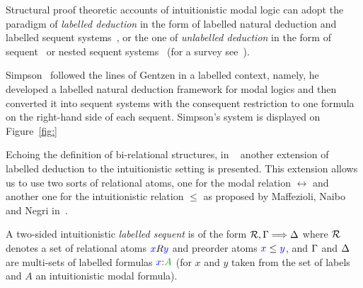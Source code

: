\documentclass[twoside]{aiml18}
\begin{document}

Structural proof theoretic accounts of intuitionistic modal logic can adopt the paradigm of \emph{labelled deduction} in the form of labelled natural deduction and labelled sequent systems~\cite{Simpson}, or the one of \emph{unlabelled deduction} in the form of sequent~\cite{Bierman} or nested sequent systems~\cite{Strassburger} (for a survey see~\cite[Chap.~3]{Marin}).

Simpson~\cite{Simpson} followed the lines of Gentzen in a labelled context, namely, he developed a labelled natural deduction framework for modal logics and then converted it into sequent systems with the consequent restriction to one formula on the right-hand side of each sequent. Simpson's system is displayed on Figure~\ref{fig:}

Echoing the definition of bi-relational structures, in  ~\cite{MarinMoralesStrassburger} another extension of labelled deduction to the intuitionistic setting is presented. This extension allows us to use two sorts of relational atoms, one for the modal relation $\rel$ and another one for the intuitionistic relation $\leq$ as proposed by Maffezioli, Naibo and Negri in~\cite{Maffezioli}. 
%

\begin{definition}
	A two-sided intuitionistic \emph{labelled sequent} is of the form $\mathcal{R}, \Gamma \Longrightarrow \Delta$ where $\mathcal{R}$ denotes a set of relational atoms ${\color{blue}{x}}R{\color{blue}{y}}$ and preorder atoms ${\color{blue}{x}}\le{{\color{blue}{y}}}$, and $\Gamma$ and $\Delta$ are multi-sets of labelled formulas $\labels{x}{A}$ (for $x$ and $y$ taken from the set of labels and $A$ an intuitionistic modal formula).
\end{definition}
\end{document}
